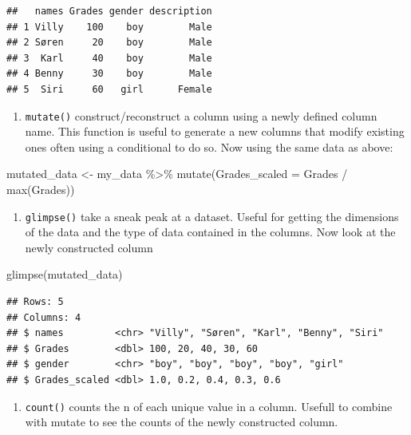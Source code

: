 \documentclass[
]{book}
\newenvironment{Shaded}{\begin{snugshade}}{\end{snugshade}}
\newcommand{\AttributeTok}[1]{\textcolor[rgb]{0.77,0.63,0.00}{#1}}
\newcommand{\FunctionTok}[1]{\textcolor[rgb]{0.00,0.00,0.00}{#1}}
\newcommand{\NormalTok}[1]{#1}
\newcommand{\OtherTok}[1]{\textcolor[rgb]{0.56,0.35,0.01}{#1}}
\newcommand{\SpecialCharTok}[1]{\textcolor[rgb]{0.00,0.00,0.00}{#1}}
\providecommand{\tightlist}{%
  \setlength{\itemsep}{0pt}\setlength{\parskip}{0pt}}
\begin{document}
\begin{verbatim}
##   names Grades gender description
## 1 Villy    100    boy        Male
## 2 Søren     20    boy        Male
## 3  Karl     40    boy        Male
## 4 Benny     30    boy        Male
## 5  Siri     60   girl      Female
\end{verbatim}

\begin{enumerate}
\def\labelenumi{\arabic{enumi}.}
\tightlist
\item
  \texttt{mutate()} construct/reconstruct a column using a newly defined
  column name. This function is useful to generate a new columns that
  modify existing ones often using a conditional to do so. Now using the
  same data as above:
\end{enumerate}

\begin{Shaded}
\begin{Highlighting}[]
\NormalTok{  mutated\_data }\OtherTok{\textless{}{-}}\NormalTok{ my\_data }\SpecialCharTok{\%\textgreater{}\%}
  \FunctionTok{mutate}\NormalTok{(}\AttributeTok{Grades\_scaled =}\NormalTok{ Grades }\SpecialCharTok{/} \FunctionTok{max}\NormalTok{(Grades))}
\end{Highlighting}
\end{Shaded}

\begin{enumerate}
\def\labelenumi{\arabic{enumi}.}
\tightlist
\item
  \texttt{glimpse()} take a sneak peak at a dataset. Useful for getting
  the dimensions of the data and the type of data contained in the
  columns. Now look at the newly constructed column
\end{enumerate}

\begin{Shaded}
\begin{Highlighting}[]
  \FunctionTok{glimpse}\NormalTok{(mutated\_data)}
\end{Highlighting}
\end{Shaded}

\begin{verbatim}
## Rows: 5
## Columns: 4
## $ names         <chr> "Villy", "Søren", "Karl", "Benny", "Siri"
## $ Grades        <dbl> 100, 20, 40, 30, 60
## $ gender        <chr> "boy", "boy", "boy", "boy", "girl"
## $ Grades_scaled <dbl> 1.0, 0.2, 0.4, 0.3, 0.6
\end{verbatim}

\begin{enumerate}
\def\labelenumi{\arabic{enumi}.}
\tightlist
\item
  \texttt{count()} counts the n of each unique value in a column.
  Usefull to combine with mutate to see the counts of the newly
  constructed column.
\end{enumerate}
\end{document}
